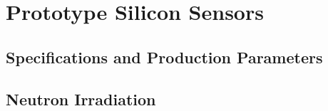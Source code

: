 \section{Prototype Silicon Sensors}
\label{sec:sensors}

\subsection{Specifications and Production Parameters}
\label{subsec:sensors_specifications}

\subsection{Neutron Irradiation}
\label{subsec:sensors_irradiation}